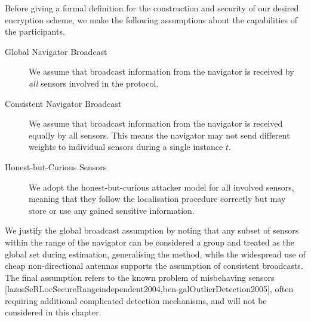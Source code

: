 Before giving a formal definition for the construction and security of our desired encryption scheme, we make the following assumptions about the capabilities of the participants.
\begin{description}
    \item[Global Navigator Broadcast] We assume that broadcast information from the navigator is received by \textit{all} sensors involved in the protocol.
    \item[Consistent Navigator Broadcast] We assume that broadcast information from the navigator is received equally by all sensors. This means the navigator may not send different weights to individual sensors during a single instance $t$.
    \item[Honest-but-Curious Sensors] We adopt the honest-but-curious attacker model for all involved sensors, meaning that they follow the localisation procedure correctly but may store or use any gained sensitive information.
\end{description}
We justify the global broadcast assumption by noting that any subset of sensors within the range of the navigator can be considered a group and treated as the global set during estimation, generalising the method, while the widespread use of cheap non-directional antennas supports the assumption of consistent broadcasts. The final assumption refers to the known problem of misbehaving sensors [lazosSeRLocSecureRangeindependent2004,ben-galOutlierDetection2005], often requiring additional complicated detection mechanisms, and will not be considered in this chapter.

